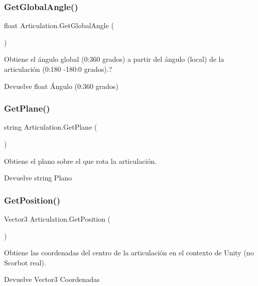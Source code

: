 \subsubsection{\texorpdfstring{GetGlobalAngle()}{GetGlobalAngle()}}
{\footnotesize\ttfamily float Articulation.\+Get\+Global\+Angle (\begin{DoxyParamCaption}{ }\end{DoxyParamCaption})\hspace{0.3cm}{\ttfamily [inline]}}

Obtiene el ángulo global (0\+:360 grados) a partir del ángulo (local) de la articulación (0\+:180 -\/180\+:0 grados).? \begin{DoxyReturn}{Devuelve}
float Ángulo (0\+:360 grados) 
\end{DoxyReturn}
\mbox{\label{class_articulation_ac22a47cd879d9867137cf705070dfb7b}} 
\subsubsection{\texorpdfstring{GetPlane()}{GetPlane()}}
{\footnotesize\ttfamily string Articulation.\+Get\+Plane (\begin{DoxyParamCaption}{ }\end{DoxyParamCaption})\hspace{0.3cm}{\ttfamily [inline]}}

Obtiene el plano sobre el que rota la articulación. \begin{DoxyReturn}{Devuelve}
string Plano 
\end{DoxyReturn}
\mbox{\label{class_articulation_a1a7ef254573e5d539a24d6ce58f93911}} 
\subsubsection{\texorpdfstring{GetPosition()}{GetPosition()}}
{\footnotesize\ttfamily Vector3 Articulation.\+Get\+Position (\begin{DoxyParamCaption}{ }\end{DoxyParamCaption})\hspace{0.3cm}{\ttfamily [inline]}}

Obtiene las coordenadas del centro de la articulación en el contexto de Unity (no Scorbot real). \begin{DoxyReturn}{Devuelve}
Vector3 Coordenadas 
\end{DoxyReturn}
\mbox{\label{class_articulation_af125f382466f26db3296f90fb896fd5a}} 
